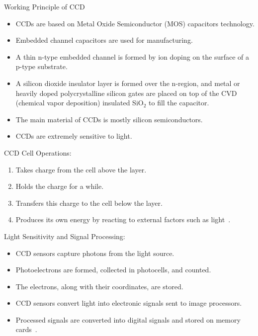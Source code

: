 \documentclass{loyola-beamer}
\begin{document}
\begin{frame}{Working Principle of CCD}
	\begin{itemize}
		\item CCDs are based on Metal Oxide Semiconductor (MOS) capacitors technology.
		\item Embedded channel capacitors are used for manufacturing.
		\item A thin n-type embedded channel is formed by ion doping on the surface of a p-type substrate.
		\item A silicon dioxide insulator layer is formed over the n-region, and metal or heavily doped polycrystalline silicon gates are placed on top of the CVD (chemical vapor deposition) insulated SiO\(_2\) to fill the capacitor.
		\item The main material of CCDs is mostly silicon semiconductors.
		\item CCDs are extremely sensitive to light.
	\end{itemize}
\end{frame}

\begin{frame}{CCD Cell Operations:}
	\begin{enumerate}
		\item Takes charge from the cell above the layer.
		\item Holds the charge for a while.
		\item Transfers this charge to the cell below the layer.
		\item Produces its own energy by reacting to external factors such as light~\cite{sen2008}.
	\end{enumerate}
\end{frame}

\begin{frame}{Light Sensitivity and Signal Processing:}
	\begin{itemize}
		\item CCD sensors capture photons from the light source.
		\item Photoelectrons are formed, collected in photocells, and counted.
		\item The electrons, along with their coordinates, are stored.
		\item CCD sensors convert light into electronic signals sent to image processors.
		\item Processed signals are converted into digital signals and stored on memory cards~\cite{sen2008,  litwiller2001}.
	\end{itemize}
\end{frame}
\end{document}
